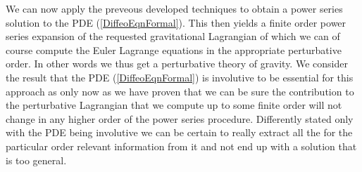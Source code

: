 \documentclass[a4paper,12pt, DIV=14, BCOR=5mm, twoside, headsepline]{scrbook}
\begin{document}
We can now apply the preveous developed techniques to obtain a power series solution to the PDE (\ref{DiffeoEqnFormal}). This then yields a finite order power series expansion of the requested gravitational Lagrangian of which we can of course compute the Euler Lagrange equations in the appropriate perturbative order. In other words we thus get a perturbative theory of gravity. We consider the result that the PDE (\ref{DiffeoEqnFormal}) is involutive to be essential for this approach as only now as we have proven that we can be sure the contribution to the perturbative Lagrangian that we compute up to some finite order will not change in any higher order of the power series procedure. Differently stated only with the PDE being involutive we can be certain to  really extract all the for the particular order relevant information from it and not end up with a solution that is too general. \\
\end{document}

